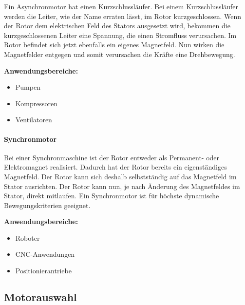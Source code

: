 Ein Asynchronmotor hat einen Kurzschlussläufer.
Bei einem Kurzschlussläufer werden die Leiter, wie der Name erraten lässt, im Rotor kurzgeschlossen. Wenn der Rotor dem elektrischen Feld des Stators ausgesetzt wird, bekommen die kurzgeschlossenen Leiter eine Spannung, die einen Stromfluss verursachen. Im Rotor befindet sich jetzt ebenfalls ein eigenes Magnetfeld. Nun wirken die Magnetfelder entgegen und somit verursachen die Kräfte eine Drehbewegung. 

\textbf{Anwendungsbereiche:}

\begin{itemize}
	\item{Pumpen}
	\item{Kompressoren}
	\item{Ventilatoren}
\end{itemize}

\paragraph{Synchronmotor}
\label{sec:synchronmotor}

Bei einer Synchronmaschine ist der Rotor entweder als Permanent- oder Elektromagnet realisiert. Dadurch hat der Rotor bereits ein eigenständiges Magnetfeld. Der Rotor kann sich deshalb selbstständig auf das Magnetfeld im Stator ausrichten. Der Rotor kann nun, je nach Änderung des Magnetfeldes im Stator, direkt mitlaufen. Ein Synchronmotor ist für höchste dynamische Bewegungskriterien geeignet. 

\textbf{Anwendungsbereiche:}

\begin{itemize}
	\item{Roboter}
	\item{CNC-Anwendungen}
	\item{Positionierantriebe}
\end{itemize}

\newpage

\subsection{Motorauswahl}
\label{sec:motorauswahl}

